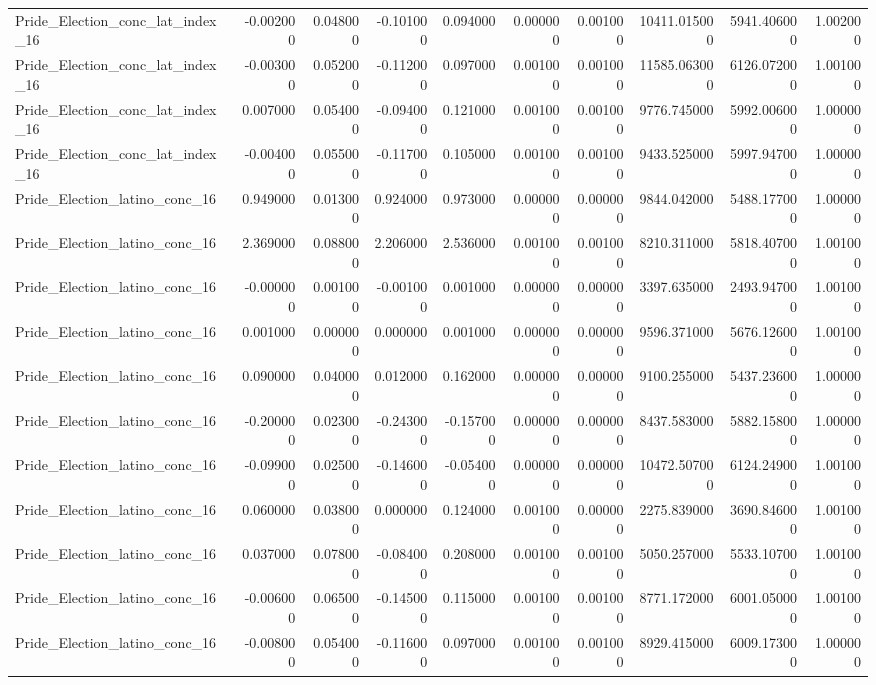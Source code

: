 \begin{table}
\begin{tabular}{lrrrrrrrrr}
Pride_Election_conc_lat_index_16 & -0.002000 & 0.048000 & -0.101000 & 0.094000 & 0.000000 & 0.001000 & 10411.015000 & 5941.406000 & 1.002000 \\
Pride_Election_conc_lat_index_16 & -0.003000 & 0.052000 & -0.112000 & 0.097000 & 0.001000 & 0.001000 & 11585.063000 & 6126.072000 & 1.001000 \\
Pride_Election_conc_lat_index_16 & 0.007000 & 0.054000 & -0.094000 & 0.121000 & 0.001000 & 0.001000 & 9776.745000 & 5992.006000 & 1.000000 \\
Pride_Election_conc_lat_index_16 & -0.004000 & 0.055000 & -0.117000 & 0.105000 & 0.001000 & 0.001000 & 9433.525000 & 5997.947000 & 1.000000 \\
Pride_Election_latino_conc_16 & 0.949000 & 0.013000 & 0.924000 & 0.973000 & 0.000000 & 0.000000 & 9844.042000 & 5488.177000 & 1.000000 \\
Pride_Election_latino_conc_16 & 2.369000 & 0.088000 & 2.206000 & 2.536000 & 0.001000 & 0.001000 & 8210.311000 & 5818.407000 & 1.001000 \\
Pride_Election_latino_conc_16 & -0.000000 & 0.001000 & -0.001000 & 0.001000 & 0.000000 & 0.000000 & 3397.635000 & 2493.947000 & 1.001000 \\
Pride_Election_latino_conc_16 & 0.001000 & 0.000000 & 0.000000 & 0.001000 & 0.000000 & 0.000000 & 9596.371000 & 5676.126000 & 1.001000 \\
Pride_Election_latino_conc_16 & 0.090000 & 0.040000 & 0.012000 & 0.162000 & 0.000000 & 0.000000 & 9100.255000 & 5437.236000 & 1.000000 \\
Pride_Election_latino_conc_16 & -0.200000 & 0.023000 & -0.243000 & -0.157000 & 0.000000 & 0.000000 & 8437.583000 & 5882.158000 & 1.000000 \\
Pride_Election_latino_conc_16 & -0.099000 & 0.025000 & -0.146000 & -0.054000 & 0.000000 & 0.000000 & 10472.507000 & 6124.249000 & 1.001000 \\
Pride_Election_latino_conc_16 & 0.060000 & 0.038000 & 0.000000 & 0.124000 & 0.001000 & 0.000000 & 2275.839000 & 3690.846000 & 1.001000 \\
Pride_Election_latino_conc_16 & 0.037000 & 0.078000 & -0.084000 & 0.208000 & 0.001000 & 0.001000 & 5050.257000 & 5533.107000 & 1.001000 \\
Pride_Election_latino_conc_16 & -0.006000 & 0.065000 & -0.145000 & 0.115000 & 0.001000 & 0.001000 & 8771.172000 & 6001.050000 & 1.001000 \\
Pride_Election_latino_conc_16 & -0.008000 & 0.054000 & -0.116000 & 0.097000 & 0.001000 & 0.001000 & 8929.415000 & 6009.173000 & 1.000000 \\

\end{tabular}
\end{table}

